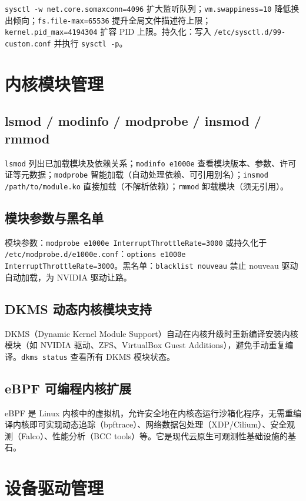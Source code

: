\documentclass[12pt,UTF8]{ctexbook}
\begin{document}
\verb|sysctl -w net.core.somaxconn=4096| 扩大监听队列；\verb|vm.swappiness=10| 降低换出倾向；\verb|fs.file-max=65536| 提升全局文件描述符上限；\verb|kernel.pid_max=4194304| 扩容 PID 上限。持久化：写入 \verb|/etc/sysctl.d/99-custom.conf| 并执行 \verb|sysctl -p|。

  \section{内核模块管理}
    \subsection{lsmod / modinfo / modprobe / insmod / rmmod}

\verb|lsmod| 列出已加载模块及依赖关系；\verb|modinfo e1000e| 查看模块版本、参数、许可证等元数据；\verb|modprobe| 智能加载（自动处理依赖、可引用别名）；\verb|insmod /path/to/module.ko| 直接加载（不解析依赖）；\verb|rmmod| 卸载模块（须无引用）。

    \subsection{模块参数与黑名单}

模块参数：\verb|modprobe e1000e InterruptThrottleRate=3000| 或持久化于 \verb|/etc/modprobe.d/e1000e.conf|：\verb|options e1000e InterruptThrottleRate=3000|。黑名单：\verb|blacklist nouveau| 禁止 nouveau 驱动自动加载，为 NVIDIA 驱动让路。

    \subsection{DKMS 动态内核模块支持}

DKMS（Dynamic Kernel Module Support）自动在内核升级时重新编译安装内核模块（如 NVIDIA 驱动、ZFS、VirtualBox Guest Additions），避免手动重复编译。\verb|dkms status| 查看所有 DKMS 模块状态。

    \subsection{eBPF 可编程内核扩展}

eBPF 是 Linux 内核中的虚拟机，允许安全地在内核态运行沙箱化程序，无需重编译内核即可实现动态追踪（bpftrace）、网络数据包处理（XDP/Cilium）、安全观测（Falco）、性能分析（BCC tools）等。它是现代云原生可观测性基础设施的基石。

  \section{设备驱动管理}
\end{document}
